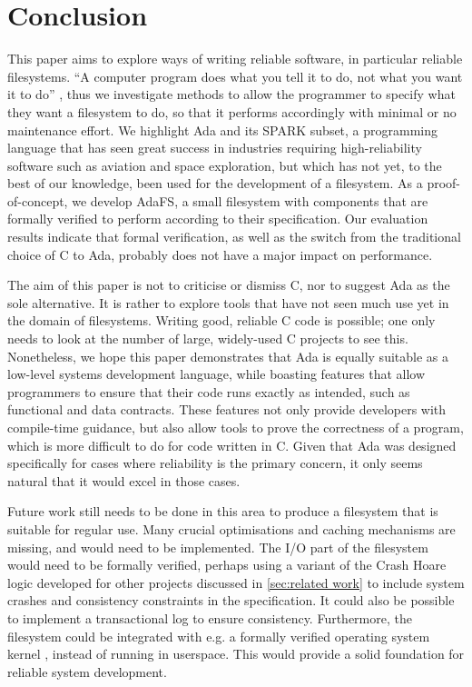 \section{Conclusion}
This paper aims to explore ways of writing reliable software, in particular reliable filesystems.
``A computer program does what you tell it to do, not what you want it to do'' \cite{bloch1997}, thus we investigate methods to allow the programmer to specify what they want a filesystem to do, so that it performs accordingly with minimal or no maintenance effort.
We highlight Ada and its SPARK subset, a programming language that has seen great success in industries requiring high-reliability software such as aviation and space exploration, but which has not yet, to the best of our knowledge, been used for the development of a filesystem.
As a proof-of-concept, we develop AdaFS, a small filesystem with components that are formally verified to perform according to their specification.
Our evaluation results indicate that formal verification, as well as the switch from the traditional choice of C to Ada, probably does not have a major impact on performance.

The aim of this paper is not to criticise or dismiss C, nor to suggest Ada as the sole alternative.
It is rather to explore tools that have not seen much use yet in the domain of filesystems.
Writing good, reliable C code is possible; one only needs to look at the number of large, widely-used C projects to see this.
Nonetheless, we hope this paper demonstrates that Ada is equally suitable as a low-level systems development language, while boasting features that allow programmers to ensure that their code runs exactly as intended, such as functional and data contracts.
These features not only provide developers with compile-time guidance, but also allow tools to prove the correctness of a program, which is more difficult to do for code written in C.
Given that Ada was designed specifically for cases where reliability is the primary concern, it only seems natural that it would excel in those cases.

Future work still needs to be done in this area to produce a filesystem that is suitable for regular use.
Many crucial optimisations and caching mechanisms are missing, and would need to be implemented.
The I/O part of the filesystem would need to be formally verified, perhaps using a variant of the Crash Hoare logic developed for other projects discussed in \autoref{sec:related work} to include system crashes and consistency constraints in the specification.
It could also be possible to implement a transactional log to ensure consistency.
Furthermore, the filesystem could be integrated with e.g. a formally verified operating system kernel \cite{king2019}, instead of running in userspace.
This would provide a solid foundation for reliable system development.
